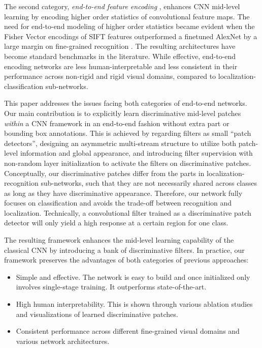 \documentclass[10pt,twocolumn,letterpaper]{article}
\begin{document}
The second category, \textit{end-to-end feature encoding} \cite{b_cnn, c_b_cnn, lowrank_bcnn, highorder1, highorder2},
enhances CNN mid-level learning by encoding higher order statistics of convolutional feature maps. The need
for end-to-end modeling of higher order statistics became evident when the Fisher Vector encodings of
SIFT features outperformed a finetuned AlexNet by a large margin on fine-grained recognition \cite{fgvcfisher}. The resulting
architectures have become standard benchmarks in the literature. While effective, end-to-end encoding networks are
less human-interpretable and less consistent in their performance across non-rigid
and rigid visual domains, compared to localization-classification sub-networks.

This paper addresses the issues facing both categories of end-to-end networks. Our main contribution is to explicitly learn
discriminative mid-level patches \textit{within} a CNN framework in an end-to-end fashion without extra part or
bounding box annotations. This is achieved by regarding  filters as small ``patch detectors'', designing an asymmetric
multi-stream structure to utilize both patch-level information and global appearance, and introducing filter supervision with
non-random layer initialization to activate the filters on discriminative patches. Conceptually, our discriminative patches
differ from the parts in localization-recognition sub-networks, such that they are not necessarily shared across classes as long as they have
discriminative appearance. Therefore, our network fully focuses on classification and avoids the trade-off between recognition
and localization. Technically, a convolutional filter trained as
a discriminative patch detector will only yield a high response at a certain region for one class.

The resulting framework enhances the mid-level learning capability of the classical CNN by introducing a bank of
discriminative filters. In practice, our framework preserves the
advantages of both categories of previous approaches:
\begin{itemize}[noitemsep, topsep=0pt]
\item Simple and effective. The network is easy to build and once initialized only involves single-stage training. It
outperforms state-of-the-art.
\vspace{2pt}
\item High human interpretability. This is shown through various ablation studies and visualizations of learned
discriminative patches.
\vspace{2pt}
\item Consistent performance across different fine-grained visual domains and various network architectures.
\end{itemize}
\end{document}
